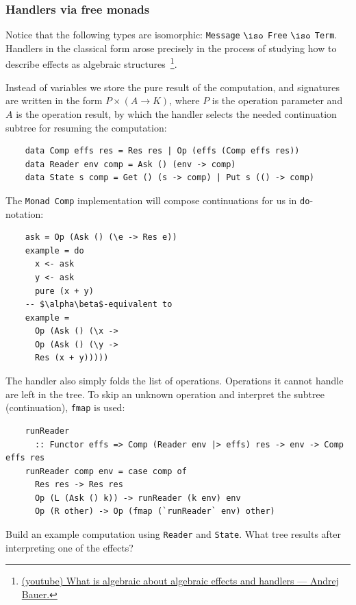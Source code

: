 \subsubsection{Handlers via free monads} \label{subsubsec:free-monad-handlers}

Notice that the following types are isomorphic: \texttt{Message} $\iso$ \texttt{Free} $\iso$ \texttt{Term}.
Handlers in the classical form arose precisely in the process of studying how to describe effects as algebraic structures~\cite{bauer2018algebraic}\footnote{\href{https://www.youtube.com/watch?v=vPVMXLJVylU&list=PLt7hcIEdZLAkebYy70DdBDm2qLrw7ptfp}{(youtube) What is algebraic about algebraic effects and handlers --- Andrej Bauer.}}.

Instead of variables we store the pure result of the computation, and signatures are written in the form $P\times (A \to K)$, where $P$ is the operation parameter and $A$ is the operation result, by which the handler selects the needed continuation subtree for resuming the computation:
\begin{verbatim}
    data Comp effs res = Res res | Op (effs (Comp effs res))
    data Reader env comp = Ask () (env -> comp)
    data State s comp = Get () (s -> comp) | Put s (() -> comp)
\end{verbatim}

The \texttt{Monad Comp} implementation will compose continuations for us in \texttt{do}-notation:
\begin{verbatim}
    ask = Op (Ask () (\e -> Res e))
    example = do
      x <- ask
      y <- ask
      pure (x + y)
    -- $\alpha\beta$-equivalent to
    example =
      Op (Ask () (\x ->
      Op (Ask () (\y ->
      Res (x + y)))))
\end{verbatim}

The handler also simply folds the list of operations.
Operations it cannot handle are left in the tree.
To skip an unknown operation and interpret the subtree (continuation), \texttt{fmap} is used:
\begin{verbatim}
    runReader
      :: Functor effs => Comp (Reader env |> effs) res -> env -> Comp effs res
    runReader comp env = case comp of
      Res res -> Res res
      Op (L (Ask () k)) -> runReader (k env) env
      Op (R other) -> Op (fmap (`runReader` env) other)
\end{verbatim}

\begin{task}
    Build an example computation using \texttt{Reader} and \texttt{State}.
    What tree results after interpreting one of the effects?
\end{task}

